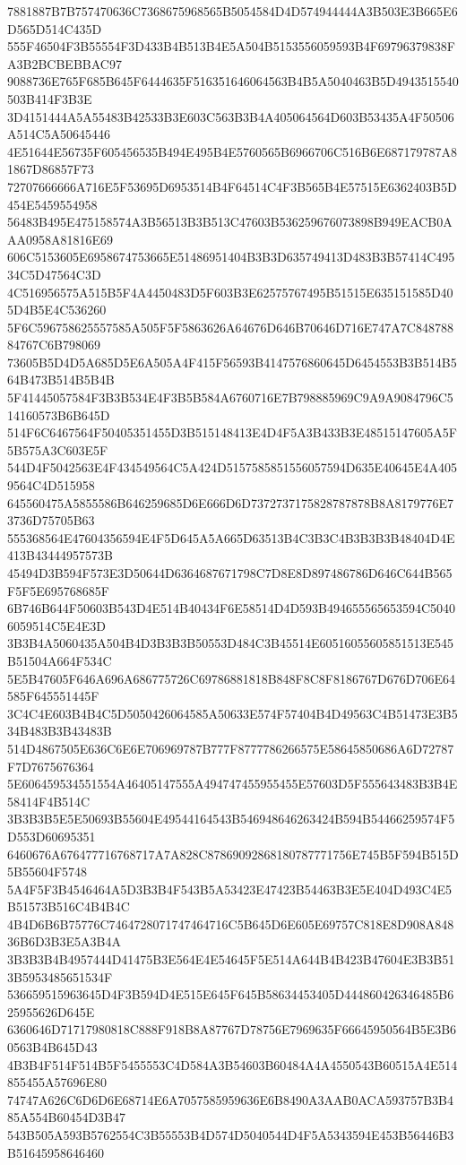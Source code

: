 {{{{{{{{{{{{{{{{{{{{{7881887B7B757470636C7368675968565B5054584D4D574944444A3B503E3B665E6D565D514C435D
555F46504F3B55554F3D433B4B513B4E5A504B5153556059593B4F69796379838FA3B2BCBEBBAC97
9088736E765F685B645F6444635F516351646064563B4B5A5040463B5D4943515540503B414F3B3E
3D4151444A5A55483B42533B3E603C563B3B4A405064564D603B53435A4F50506A514C5A50645446
4E51644E56735F605456535B494E495B4E5760565B6966706C516B6E687179787A81867D86857F73
72707666666A716E5F53695D6953514B4F64514C4F3B565B4E57515E6362403B5D454E5459554958
56483B495E475158574A3B56513B3B513C47603B536259676073898B949EACB0AAA0958A81816E69
606C5153605E6958674753665E51486951404B3B3D635749413D483B3B57414C49534C5D47564C3D
4C516956575A515B5F4A4450483D5F603B3E62575767495B51515E635151585D405D4B5E4C536260
5F6C596758625557585A505F5F5863626A64676D646B70646D716E747A7C84878884767C6B798069
73605B5D4D5A685D5E6A505A4F415F56593B4147576860645D6454553B3B514B564B473B514B5B4B
5F41445057584F3B3B534E4F3B5B584A6760716E7B798885969C9A9A9084796C514160573B6B645D
514F6C6467564F50405351455D3B515148413E4D4F5A3B433B3E48515147605A5F5B575A3C603E5F
544D4F5042563E4F434549564C5A424D5157585851556057594D635E40645E4A4059564C4D515958
645560475A5855586B646259685D6E666D6D7372737175828787878B8A8179776E73736D75705B63
555368564E47604356594E4F5D645A5A665D63513B4C3B3C4B3B3B3B48404D4E413B43444957573B
45494D3B594F573E3D50644D6364687671798C7D8E8D897486786D646C644B565F5F5E695768685F
6B746B644F50603B543D4E514B40434F6E58514D4D593B494655565653594C50406059514C5E4E3D
3B3B4A5060435A504B4D3B3B3B50553D484C3B45514E60516055605851513E545B51504A664F534C
5E5B47605F646A696A686775726C69786881818B848F8C8F8186767D676D706E64585F645551445F
3C4C4E603B4B4C5D5050426064585A50633E574F57404B4D49563C4B51473E3B534B483B3B43483B
514D4867505E636C6E6E706969787B777F8777786266575E58645850686A6D72787F7D7675676364
5E606459534551554A46405147555A494747455955455E57603D5F555643483B3B4E58414F4B514C
3B3B3B5E5E50693B55604E49544164543B546948646263424B594B54466259574F5D553D60695351
6460676A676477716768717A7A828C87869092868180787771756E745B5F594B515D5B55604F5748
5A4F5F3B4546464A5D3B3B4F543B5A53423E47423B54463B3E5E404D493C4E5B51573B516C4B4B4C
4B4D6B6B75776C7464728071747464716C5B645D6E605E69757C818E8D908A84836B6D3B3E5A3B4A
3B3B3B4B4957444D41475B3E564E4E54645F5E514A644B4B423B47604E3B3B513B5953485651534F
536659515963645D4F3B594D4E515E645F645B58634453405D444860426346485B625955626D645E
6360646D71717980818C888F918B8A87767D78756E7969635F66645950564B5E3B60563B4B645D43
4B3B4F514F514B5F5455553C4D584A3B54603B60484A4A4550543B60515A4E514855455A57696E80
74747A626C6D6D6E68714E6A7057585959636E6B8490A3AAB0ACA593757B3B485A554B60454D3B47
543B505A593B5762554C3B55553B4D574D5040544D4F5A5343594E453B56446B3B51645958646460
}}}}}}}}}}}}}}}}}}}}}
